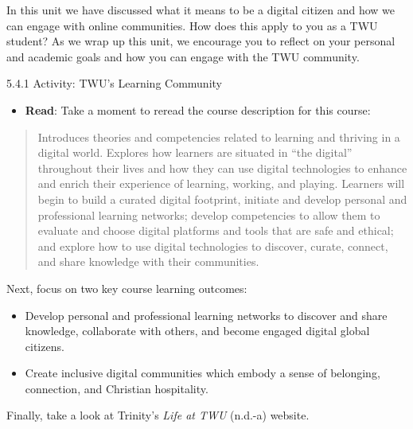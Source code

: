 \documentclass[
  letterpaper,
  DIV=11,
  numbers=noendperiod]{scrreprt}
\providecommand{\tightlist}{%
  \setlength{\itemsep}{0pt}\setlength{\parskip}{0pt}}\usepackage{longtable,booktabs,array}
\begin{document}
In this unit we have discussed what it means to be a digital citizen and
how we can engage with online communities. How does this apply to you as
a TWU student? As we wrap up this unit, we encourage you to reflect on
your personal and academic goals and how you can engage with the TWU
community.

5.4.1 Activity: TWU's Learning Community

\begin{tcolorbox}[enhanced jigsaw, toprule=.15mm, colback=white, colframe=quarto-callout-note-color-frame, bottomtitle=1mm, leftrule=.75mm, coltitle=black, titlerule=0mm, rightrule=.15mm, colbacktitle=quarto-callout-note-color!10!white, left=2mm, title={Learning Activity}, opacitybacktitle=0.6, opacityback=0, breakable, toptitle=1mm, arc=.35mm, bottomrule=.15mm]

\begin{itemize}
\tightlist
\item
  \textbf{Read}: Take a moment to reread the course description for this
  course:
\end{itemize}

\begin{quote}
Introduces theories and competencies related to learning and thriving in
a digital world. Explores how learners are situated in ``the digital''
throughout their lives and how they can use digital technologies to
enhance and enrich their experience of learning, working, and playing.
Learners will begin to build a curated digital footprint, initiate and
develop personal and professional learning networks; develop
competencies to allow them to evaluate and choose digital platforms and
tools that are safe and ethical; and explore how to use digital
technologies to discover, curate, connect, and share knowledge with
their communities.
\end{quote}

Next, focus on two key course learning outcomes:

\begin{itemize}
\tightlist
\item
  Develop personal and professional learning networks to discover and
  share knowledge, collaborate with others, and become engaged digital
  global citizens.
\item
  Create inclusive digital communities which embody a sense of
  belonging, connection, and Christian hospitality.
\end{itemize}

Finally, take a look at Trinity's \emph{Life at TWU} (n.d.-a) website.


\end{tcolorbox}
\end{document}
